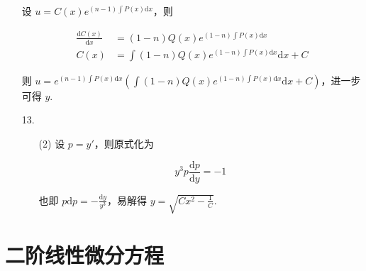 \documentclass[oneside]{ctexbook} %
\begin{document}
\begin{enumerate}
    设 $u = C(x) e^{(n-1) \int P(x) \mathrm dx}$，则
    
    $$
    \begin{aligned}
        \frac{\mathrm d C(x)}{\mathrm dx} &= (1-n)Q(x)e^{(1-n) \int P(x) \mathrm dx} \\
        C(x) &= \int (1-n)Q(x)e^{(1-n) \int P(x) \mathrm dx} \mathrm dx + C
    \end{aligned}
    $$
    
    则 $u = e^{(n-1) \int P(x) \mathrm dx} \left( \int (1-n)Q(x)e^{(1-n) \int P(x) \mathrm dx} \mathrm dx + C \right)$，进一步可得 $y$.
    \item[13.]
    \begin{enumerate}
        \item[(2)]
        设 $p = y'$，则原式化为
        
        $$
        y^3 p \frac{\mathrm dp}{\mathrm dy} = -1
        $$
        
        也即 $\displaystyle p \mathrm dp = - \frac{\mathrm dy}{y^3}$，易解得 $y = \sqrt{Cx^2 - \frac 1 C}$.
    \end{enumerate}
\end{enumerate}

\section{二阶线性微分方程}
\end{document}
